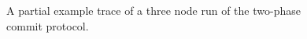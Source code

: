 \begin{figure}[!t]
  \caption{A partial example trace of a three node run of the
    two-phase commit protocol.}
  \label{fig:2pc_trace}
\end{figure}

